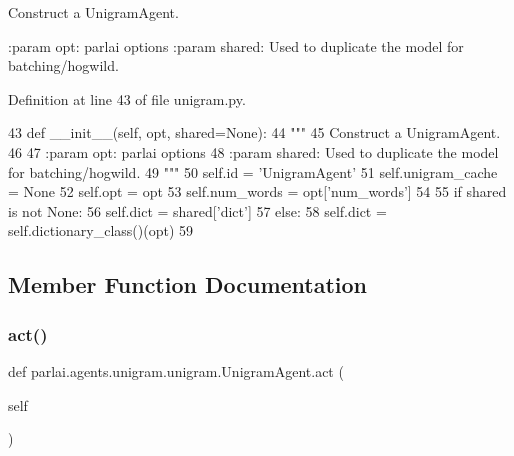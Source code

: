 \begin{DoxyVerb}Construct a UnigramAgent.

:param opt: parlai options
:param shared: Used to duplicate the model for batching/hogwild.
\end{DoxyVerb}
 

Definition at line 43 of file unigram.\+py.


\begin{DoxyCode}
43     \textcolor{keyword}{def }\_\_init\_\_(self, opt, shared=None):
44         \textcolor{stringliteral}{"""}
45 \textcolor{stringliteral}{        Construct a UnigramAgent.}
46 \textcolor{stringliteral}{}
47 \textcolor{stringliteral}{        :param opt: parlai options}
48 \textcolor{stringliteral}{        :param shared: Used to duplicate the model for batching/hogwild.}
49 \textcolor{stringliteral}{        """}
50         self.id = \textcolor{stringliteral}{'UnigramAgent'}
51         self.unigram\_cache = \textcolor{keywordtype}{None}
52         self.opt = opt
53         self.num\_words = opt[\textcolor{stringliteral}{'num\_words'}]
54 
55         \textcolor{keywordflow}{if} shared \textcolor{keywordflow}{is} \textcolor{keywordflow}{not} \textcolor{keywordtype}{None}:
56             self.dict = shared[\textcolor{stringliteral}{'dict'}]
57         \textcolor{keywordflow}{else}:
58             self.dict = self.dictionary\_class()(opt)
59 
\end{DoxyCode}


\subsection{Member Function Documentation}
\mbox{\label{classparlai_1_1agents_1_1unigram_1_1unigram_1_1UnigramAgent_a525621d38b382d27fad882ca4a8c682a}} 
\subsubsection{\texorpdfstring{act()}{act()}}
{\footnotesize\ttfamily def parlai.\+agents.\+unigram.\+unigram.\+Unigram\+Agent.\+act (\begin{DoxyParamCaption}\item[{}]{self }\end{DoxyParamCaption})}

